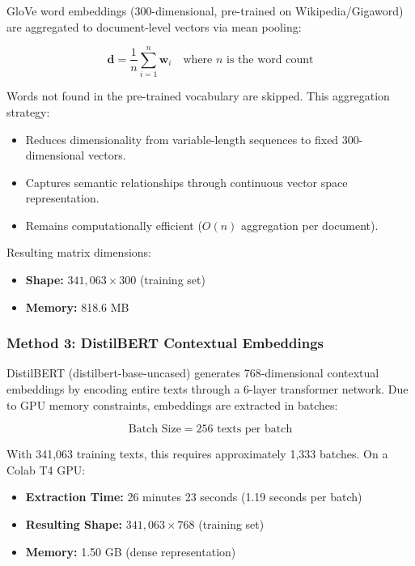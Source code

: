 \documentclass[12pt, a4paper]{article}
\begin{document}
GloVe word embeddings (300-dimensional, pre-trained on Wikipedia/Gigaword) are aggregated to document-level vectors via mean pooling:

\begin{equation}
\mathbf{d} = \frac{1}{n} \sum_{i=1}^{n} \mathbf{w}_i \quad \text{where } n \text{ is the word count}
\end{equation}

Words not found in the pre-trained vocabulary are skipped. This aggregation strategy:
\begin{itemize}
    \item Reduces dimensionality from variable-length sequences to fixed $300$-dimensional vectors.
    \item Captures semantic relationships through continuous vector space representation.
    \item Remains computationally efficient ($O(n)$ aggregation per document).
\end{itemize}

Resulting matrix dimensions:
\begin{itemize}
    \item \textbf{Shape:} $341,063 \times 300$ (training set)
    \item \textbf{Memory:} 818.6 MB
\end{itemize}

\subsubsection{Method 3: DistilBERT Contextual Embeddings}

DistilBERT (distilbert-base-uncased) generates 768-dimensional contextual embeddings by encoding entire texts through a 6-layer transformer network. Due to GPU memory constraints, embeddings are extracted in batches:

\begin{equation}
\text{Batch Size} = 256 \text{ texts per batch}
\end{equation}

With 341,063 training texts, this requires approximately 1,333 batches. On a Colab T4 GPU:
\begin{itemize}
    \item \textbf{Extraction Time:} 26 minutes 23 seconds (1.19 seconds per batch)
    \item \textbf{Resulting Shape:} $341,063 \times 768$ (training set)
    \item \textbf{Memory:} 1.50 GB (dense representation)
\end{itemize}
\end{document}
